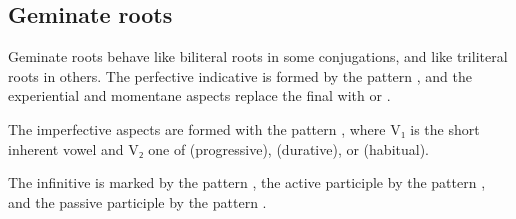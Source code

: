 \documentclass[grammar]{subfiles}
\begin{document}
\subsection{Geminate roots}
\label{ssec:vm_ii_geminate_roots}

Geminate roots behave like biliteral roots in some conjugations, and like
triliteral roots in others.  The perfective indicative is formed by the pattern
, and the experiential and momentane aspects replace the final
 with  or .

The imperfective aspects are formed with the pattern ,
where V₁ is the short inherent vowel and V₂ one of  (progressive),
 (durative), or  (habitual).

The infinitive is marked by the pattern , the active participle
by the pattern , and the passive participle by the pattern
.  


\end{document}
